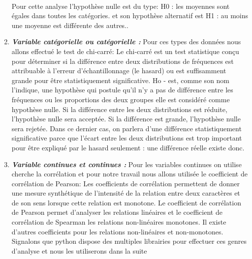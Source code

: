 \begin{enumerate}
	\paragraph{}
	Pour cette analyse l'hypothèse nulle est du type:
	H0 : les moyennes sont égales dans toutes les catégories. 
	et son hypothèse alternatif est 
	H1 : au moins une moyenne est différente des autres..
	\item \emph{\textbf{Variable catégorielle ou catégorielle  :}} 
	Pour ces types des données nous allons effectué le test de chi-carré: Le chi-carré est un test statistique conçu pour déterminer si la différence
	entre deux distributions de fréquences est attribuable à l'erreur
	d'échantillonnage (le hasard) ou est suffisamment grande pour être
	statistiquement significative.
	Ho - est, comme son nom l'indique, une hypothèse qui postule qu'il n'y a pas de différence entre les fréquences ou les proportions des deux groupes elle est considéré comme hypothèse nulle.
	Si la différence entre les deux distributions est réduite, l'hypothèse
	nulle sera acceptée. Si la différence est grande, l'hypothèse nulle sera
	rejetée. Dans ce dernier cas, on parlera d'une différence
	statistiquement significative parce que l'écart entre les deux
	distributions est trop important pour être expliqué par le hasard
	seulement : une différence réelle existe donc.
\item \emph{\textbf{Variable continues et continues  :}} 
Pour les variables continues on utilise cherche la corrélation et pour
notre travail nous allons utilisée le coefficient de corrélation de
Pearson: Les coefficients de corrélation permettent de donner une mesure
synthétique de l'intensité de la relation entre deux caractères et de
son sens lorsque cette relation est monotone. Le coefficient de
corrélation de Pearson permet d'analyser les relations linéaires et le
coefficient de corrélation de Spearman les relations non-linéaires
monotones. Il existe d'autres coefficients pour les relations
non-linéaires et non-monotones.
Signalons que python dispose des multiples librairies pour effectuer ces
genres d'analyse et nous les utiliserons dans la suite
\end{enumerate}